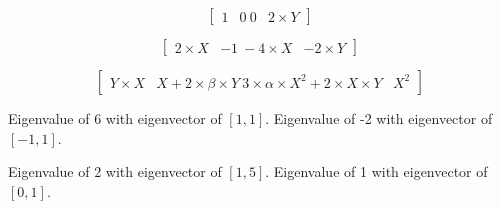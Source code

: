 \documentclass[]{memoir}
\begin{document}

\[
\begin{bmatrix}
1 & 0 \
0 & 2 \times Y
\end{bmatrix}
\]


\[
\begin{bmatrix}
2 \times X & -1  \
-4 \times X & -2 \times Y
\end{bmatrix}
\]


\[
\begin{bmatrix} Y \times X & X+2 \times \beta \times Y \ 3 \times \alpha \times X^2 + 2 \times X \times Y & X^2 \end{bmatrix}
\]


Eigenvalue of 6 with eigenvector of $[1,1]$. Eigenvalue of -2 with
eigenvector of $[-1,1]$.


Eigenvalue of 2 with eigenvector of $[1,5]$. Eigenvalue of 1 with
eigenvector of $[0,1]$.

\end{document}
